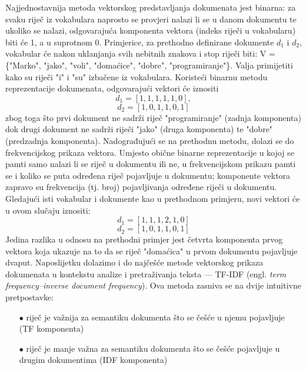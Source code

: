 \documentclass[times, utf8, zavrsni]{fer}
\begin{document}
Najjednostavnija metoda vektorskog predstavljanja dokumenata jest binarna: za svaku riječ iz vokabulara naprosto se provjeri nalazi li se u danom dokumentu te ukoliko se nalazi, odgovarajuća komponenta vektora (indeks riječi u vokabularu) biti će 1, a u suprotnom 0. Primjerice, za prethodno definirane dokumente $d_{1}$ i $d_{2}$, vokabular će nakon uklanjanja svih nebitnih znakova i stop riječi biti: V = \{"Marko", "jako", "voli", "domaćice", "dobre", "programiranje"\}. Valja primijetiti kako su riječi "i" i "su" izbačene iz vokabulara. Koristeći binarnu metodu reprezentacije dokumenata, odgovarajući vektori će iznositi
\begin{equation}
{{d_{1}}=[1, 1, 1, 1, 1, 0]},
\end{equation}
\begin{equation}
{{d_{2}}=[1, 0, 1, 1, 0, 1]}
\end{equation}
zbog toga što prvi dokument ne sadrži riječ "programiranje" (zadnja komponenta) dok drugi dokument ne sadrži riječi "jako" (druga komponenta) te "dobre" (predzadnja komponenta).
Nadograđujući se na prethodnu metodu, dolazi se do frekvencijskog prikaza vektora. Umjesto obične binarne reprezentacije u kojoj se pamti samo nalazi li se riječ u dokumentu ili ne, u frekvencijskom prikazu pamti se i koliko se puta određena riječ pojavljuje u dokumentu; komponente vektora zapravo su frekvencija (tj. broj) pojavljivanja određene riječi u dokumentu. Gledajući isti vokabular i dokumente kao u prethodnom primjeru, novi vektori će u ovom slučaju iznositi:
\begin{equation}
{{d_{1}}=[1, 1, 1, 2, 1, 0]}
\end{equation}
\begin{equation}
{{d_{2}}=[1, 0, 1, 1, 0, 1]}
\end{equation}
Jedina razlika u odnosu na prethodni primjer jest četvrta komponenta prvog vektora koja ukazuje na to da se riječ "domaćica" u prvom dokumentu pojavljuje dvaput.
Naposlijetku dolazimo i do najčešće metode vektorskog prikaza dokumenata u kontekstu analize i pretraživanja teksta — TF-IDF (engl. \textit{term frequency–inverse document frequency}). Ova metoda zasniva se na dvije intuitivne pretpostavke:
\begin{itemize}
\item[$\bullet$] riječ je važnija za semantiku dokumenta što se češće u njemu pojavljuje (TF komponenta)
\item[$\bullet$] riječ je manje važna za semantiku dokumenta što se češće pojavljuje u drugim dokumentima (IDF komponenta)
\end{itemize}
\end{document}
